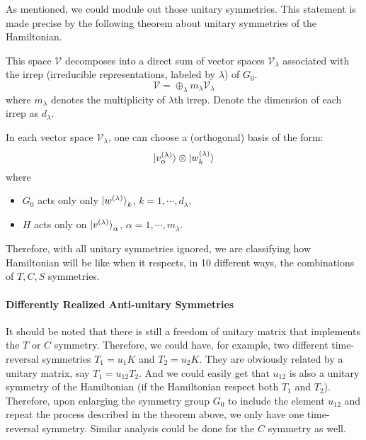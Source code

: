 \documentclass{article}
\begin{document}
As mentioned, we could module out those unitary symmetries. This statement is
made precise by the following theorem about unitary symmetries of the Hamiltonian.
\begin{thm}
This space $\mathcal{V}$ decomposes into a direct sum of vector spaces
$\mathcal{V}_\lambda$ associated with the irrep (irreducible
representations, labeled by $\lambda$) of $G_0$.
\begin{equation}
    \mathcal{V} = \oplus_\lambda m_\lambda \mathcal{V}_\lambda
\end{equation}
where $m_\lambda$ denotes the multiplicity of $\lambda$th irrep.
Denote the dimension of each irrep as $d_\lambda$.

In each vector space $\mathcal{V}_\lambda$, one can choose a
(orthogonal) basis of the form:
\begin{equation}
    \ket{v^{(\lambda)}_\alpha} \otimes \ket{w^{(\lambda)}_k}
\end{equation}
where
\begin{itemize}
    \item $G_0$ acts only only $\ket{w^{(\lambda)}}_k$,
        $k=1,\cdots,d_\lambda$,
    \item $H$ acts only on $\ket{v^{(\lambda)}}_\alpha$,
        $\alpha=1,\cdots,m_\lambda$.
\end{itemize}
\end{thm}
Therefore, with all unitary symmetries ignored, we are classifying how
Hamiltonian will be like when it respects, in 10 different ways, the
combinations of $T,C,S$ symmetries.

\paragraph{Differently Realized Anti-unitary Symmetries}
It should be noted that there is still a freedom of unitary matrix that
implements the $T$ or $C$ symmetry. Therefore, we could have, for example, two
different time-reversal symmetries $T_1 = u_1K$ and $T_2= u_2 K$. They are
obviously related by a unitary matrix, say $T_1 = u_{12} T_2$. And we could
easily get that $u_{12}$ is also a unitary symmetry of the Hamiltonian (if the
Hamiltonian respect both $T_1$ and $T_2$). Therefore, upon enlarging the
symmetry group $G_0$ to include the element $u_{12}$ and repeat the process
described in the theorem above, we only have one time-reversal symmetry. Similar
analysis could be done for the $C$ symmetry as well.
\end{document}
